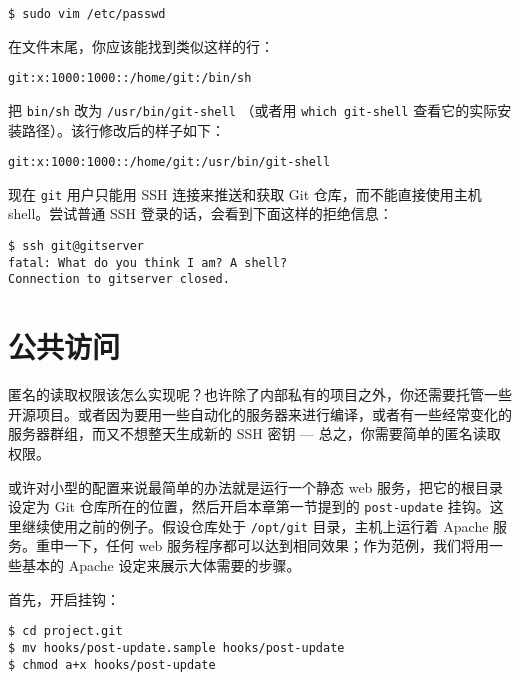 \documentclass[a4paper]{book}
\begin{document}
\begin{shaded}\begin{verbatim}
$ sudo vim /etc/passwd
\end{verbatim}\end{shaded}

在文件末尾，你应该能找到类似这样的行：

\begin{shaded}\begin{verbatim}
git:x:1000:1000::/home/git:/bin/sh
\end{verbatim}\end{shaded}

把 \texttt{bin/sh} 改为 \texttt{/usr/bin/git-shell} （或者用 \texttt{which git-shell} 查看它的实际安装路径）。该行修改后的样子如下：

\begin{shaded}\begin{verbatim}
git:x:1000:1000::/home/git:/usr/bin/git-shell
\end{verbatim}\end{shaded}

现在 \texttt{git} 用户只能用 SSH 连接来推送和获取 Git 仓库，而不能直接使用主机 shell。尝试普通 SSH 登录的话，会看到下面这样的拒绝信息：

\begin{shaded}\begin{verbatim}
$ ssh git@gitserver
fatal: What do you think I am? A shell?
Connection to gitserver closed.
\end{verbatim}\end{shaded}

\section{公共访问}

匿名的读取权限该怎么实现呢？也许除了内部私有的项目之外，你还需要托管一些开源项目。或者因为要用一些自动化的服务器来进行编译，或者有一些经常变化的服务器群组，而又不想整天生成新的 SSH 密钥 --- 总之，你需要简单的匿名读取权限。

或许对小型的配置来说最简单的办法就是运行一个静态 web 服务，把它的根目录设定为 Git 仓库所在的位置，然后开启本章第一节提到的 \texttt{post-update} 挂钩。这里继续使用之前的例子。假设仓库处于 \texttt{/opt/git} 目录，主机上运行着 Apache 服务。重申一下，任何 web 服务程序都可以达到相同效果；作为范例，我们将用一些基本的 Apache 设定来展示大体需要的步骤。

首先，开启挂钩：

\begin{shaded}\begin{verbatim}
$ cd project.git
$ mv hooks/post-update.sample hooks/post-update
$ chmod a+x hooks/post-update
\end{verbatim}\end{shaded}
\end{document}

